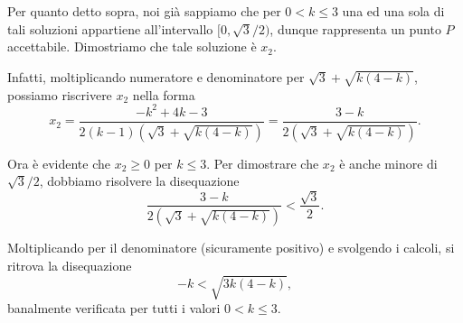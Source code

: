 {Per quanto detto sopra, noi già sappiamo che per $0<k\leq 3$ una ed una sola di tali soluzioni appartiene all'intervallo $[0,\sqrt{3}/2)$, dunque rappresenta un punto $P$ accettabile. Dimostriamo che tale soluzione è $x_{2}$.

Infatti, moltiplicando numeratore e denominatore per $\sqrt{3}+\sqrt{k(4-k)}$, possiamo riscrivere $x_{2}$ nella forma
$$x_{2}=\frac{-k^{2}+4k-3}{2(k-1)(\sqrt{3}+\sqrt{k(4-k)})}=
\frac{3-k}{2(\sqrt{3}+\sqrt{k(4-k)})}.$$

Ora è evidente che $x_{2}\geq 0$ per $k\leq 3$. Per dimostrare che $x_{2}$ è anche minore di $\sqrt{3}/2$, dobbiamo risolvere la disequazione
$$\frac{3-k}{2(\sqrt{3}+\sqrt{k(4-k)})}<\frac{\sqrt{3}}{2}.$$

Moltiplicando per il denominatore (sicuramente positivo) e svolgendo i calcoli, si ritrova la disequazione
$$-k< \sqrt{3k(4-k)},$$
banalmente verificata per tutti i valori $0<k\leq 3$.
}

\renewcommand{\SoluzioniAlternative}{
}

\renewcommand{\Osservazioni}{\TitoloOsservazione
Nella soluzione presentata abbiamo ottenuto la condizione su $k$ ragionando sulla crescenza e decrescenza delle intensità percepite. Avremmo anche potuto limitarci ad impostare l'equazione $I_{A}(x)=I_{B}(x)=I_{C}(x)$ e, \emph{dopo} aver ottenuto le soluzioni $x_{1}$ e $x_{2}$, discutere al variare di $k$ la loro appartenenza all'intervallo di accettabilità $[0,\sqrt{3}/2)$. Questo però ci avrebbe portato a discutere ben 4 disequazioni irrazionali.

Per i lettori interessati a questo approccio, enunciamo le conclusioni di tale discussione senza riportarne i passaggi: ferme restando le condizioni $k\neq 1$ (altrimenti l'equazione è di primo grado e va studiata a parte) e $k\in[0,4]$ (altrimenti il discriminante è negativo), abbiamo che $x_{1}<0$ per ogni $k>1$ e $x_{1}>\sqrt{3}/2$ per ogni $k<1$ (quindi in particolare $x_{1}$ non sta mai nell'intervallo considerato), mentre $x_{2}\geq 0$ per $k\leq 3$ e
$x_{2}<\sqrt{3}/2$ per $k>0$.  }

\renewcommand{\Commenti}{
}
